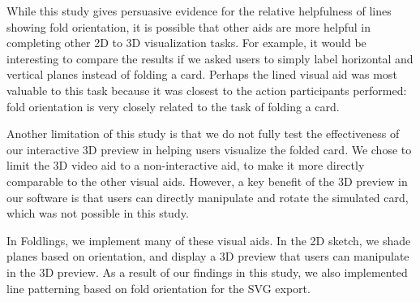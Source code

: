 While this study gives persuasive evidence for the relative helpfulness
of lines showing fold orientation, it is possible that other aids are
more helpful in completing other 2D to 3D visualization tasks. For
example, it would be interesting to compare the results if we asked
users to simply label horizontal and vertical planes instead of folding
a card. Perhaps the lined visual aid was most valuable to this task
because it was closest to the action participants performed: fold
orientation is very closely related to the task of folding a card.

Another limitation of this study is that we do not fully test the
effectiveness of our interactive 3D preview in helping users visualize
the folded card. We chose to limit the 3D video aid to a non-interactive
aid, to make it more directly comparable to the other visual aids.
However, a key benefit of the 3D preview in our software is that users
can directly manipulate and rotate the simulated card, which was not
possible in this study.

In Foldlings, we implement many of these visual aids. In the 2D sketch,
we shade planes based on orientation, and display a 3D preview that
users can manipulate in the 3D preview. As a result of our findings in
this study, we also implemented line patterning based on fold
orientation for the SVG export.

